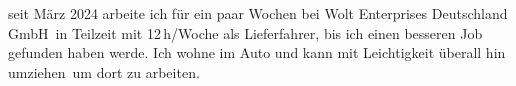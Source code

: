 		seit März 2024 arbeite ich für ein paar Wochen bei \glqq Wolt Enterprises Deutschland GmbH\grqq\ in Teilzeit mit 12\,h/Woche als Lieferfahrer, bis ich einen besseren Job gefunden haben werde.
		Ich wohne im Auto und kann mit Leichtigkeit überall hin \glqq umziehen\grqq\, um dort zu arbeiten.